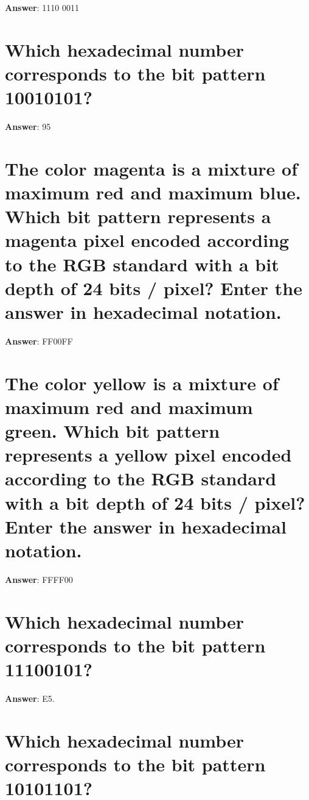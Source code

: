 \documentclass[a4paper,11pt,oneside]{book}
\begin{document}
\begin{sloppypar}
\label{q:423:sa:en:True}

\textbf{Answer}: 1110 0011



\section{Which hexadecimal number corresponds to the bit pattern 10010101?}

\label{q:424:sa:en:True}

\textbf{Answer}: 95



\section{The color magenta is a mixture of maximum red and maximum blue. Which bit pattern represents a magenta pixel encoded according to the RGB standard with a bit depth of 24 bits / pixel? Enter the answer in hexadecimal notation.}

\label{q:425:sa:en:True}

\textbf{Answer}: FF00FF



\section{The color yellow is a mixture of maximum red and maximum green. Which bit pattern represents a yellow pixel encoded according to the RGB standard with a bit depth of 24 bits / pixel? Enter the answer in hexadecimal notation.}

\label{q:426:sa:en:True}

\textbf{Answer}: FFFF00



\section{Which hexadecimal number corresponds to the bit pattern 11100101?}

\label{q:427:sa:en:True}

\textbf{Answer}: E5.



\section{Which hexadecimal number corresponds to the bit pattern 10101101?}

\label{q:428:sa:en:True}


\end{sloppypar}
\end{document}
